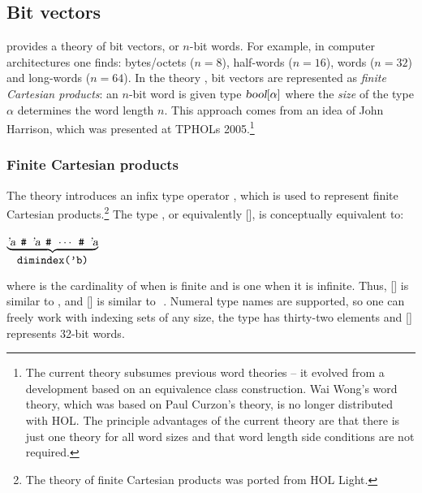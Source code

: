 \subsection{Bit vectors}
\label{sec:bit-vectors}

{
\newcommand{\fcp}[2]{\ty{#1}[\ty{#2}]}
\newcommand{\worda}{\fcp{\bool}{\ensuremath\alpha}}
\newcommand{\wordb}{\fcp{\bool}{\ensuremath\beta}}
\newcommand{\wordc}{\fcp{\bool}{\ensuremath\gamma}}
\newcommand{\rarr}{\ensuremath\rightarrow}
\newcommand{\hash}{\,\holtxt{\#}\,}
\newcommand{\oo}[2]{\mbox{\holtxt{#1\,'\,#2}}}

\HOL{} provides a theory of bit vectors, or $n$-bit words.  For example, in computer architectures one finds:
bytes/octets ($n = 8$), half-words ($n = 16$), words ($n = 32$) and long-words
($n = 64$).  In the theory , bit vectors are represented as
\emph{finite Cartesian products}: an $n$-bit word is given type $\worda$
where the \emph{size} of the type $\alpha$ determines the word length $n$.    This
approach comes from an idea of John Harrison, which was presented at TPHOLs
2005.\footnote{The current theory subsumes previous word theories -- it evolved from a development based on an equivalence class construction.  Wai Wong's word theory, which was based on Paul Curzon's  theory, is no longer distributed with HOL.  The principle advantages of the current theory are that there is just one theory for all word sizes and that word length side conditions are not required.}

\subsubsection{Finite Cartesian products}

The \HOL{} theory  introduces an infix type operator
\holtxt{**}, which is used to represent finite Cartesian products.\footnote{The theory of
finite Cartesian products was ported from HOL Light.}  The type , or equivalently \fcp{'a}{'b}, is conceptually equivalent to:
\begin{hol}
$\underbrace{\ty{'a}\;\hash\;\ty{'a}\;\hash\;\cdots\;\hash\;\ty{'a}}_{\holtxt{dimindex('b)}}$
\end{hol}
where  is the cardinality of  when  is finite and is one when it is infinite.  Thus, \fcp{'a}{\num} is similar to , and \fcp{'a}{\bool} is similar to \hash{}.  Numeral type names are supported, so one can freely work with indexing sets of any size, \eg{} the type  has thirty-two elements and \fcp{\bool}{32} represents 32-bit words.

}
